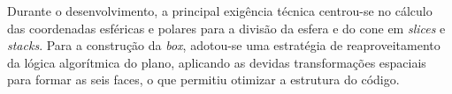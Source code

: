 \documentclass[11pt, a4paper, fleqn]{article}
\begin{document}
\noindent Durante o desenvolvimento, a principal exigência técnica centrou-se no cálculo das coordenadas esféricas e polares para a divisão da esfera e do cone em \textit{slices} e \textit{stacks}. Para a construção da \textit{box}, adotou-se uma estratégia de reaproveitamento da lógica algorítmica do plano, aplicando as devidas transformações espaciais para formar as seis faces, o que permitiu otimizar a estrutura do código.
\end{document}
